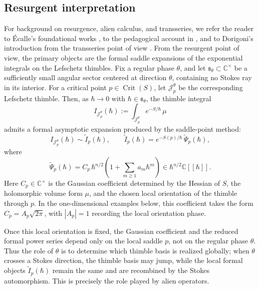 \documentclass[11pt]{amsart}
\theoremstyle{plain}
\newcommand{\C}{\mathbb C}
\newcommand{\Crit}{\operatorname{Crit}}
\newcommand{\J}{\mathcal J}
\begin{document}
\subsection{Resurgent interpretation}\label{sec:resurgence}
For background on resurgence, alien calculus, and transseries, we refer the reader to \'Ecalle's foundational works \cite{Ecalle81a,Ecalle81b,Ecalle85}, to the pedagogical account in \cite{MitschiSauzin2016}, and to Dorigoni's introduction from the transseries point of view \cite{Dorigoni2014}.
From the resurgent point of view, the primary objects are the formal saddle
expansions of the exponential integrals on the Lefschetz thimbles.  Fix a
regular phase \(\theta\), and let \(\mathfrak s_\theta\subset\C^\times\) be
a sufficiently small angular sector centered at direction \(\theta\),
containing no Stokes ray in its interior.  For a critical point
\(p\in\Crit(S)\), let \(\J_p^\theta\) be the corresponding Lefschetz
thimble.  Then, as \(\hbar\to0\) with \(\hbar\in\mathfrak s_\theta\), the
thimble integral
\begin{equation*}
I_{\J_p^\theta}(\hbar)
:=
\int_{\J_p^\theta} e^{-S/\hbar}\,\mu
\end{equation*}
admits a formal asymptotic expansion produced by the saddle-point method:
\begin{equation*}
I_{\J_p^\theta}(\hbar)
\sim
\widetilde I_p(\hbar),
\qquad
\widetilde I_p(\hbar)
=
e^{-S(p)/\hbar}\,
\widetilde\Psi_p(\hbar),
\end{equation*}
where
\begin{equation*}
\widetilde\Psi_p(\hbar)
=
C_p\,\hbar^{n/2}
\left(1+\sum_{m\ge1}a_m\hbar^m\right)
\in
\hbar^{n/2}\C[[\hbar]].
\end{equation*}
Here \(C_p\in\C^\times\) is the Gaussian coefficient determined by the
Hessian of \(S\), the holomorphic volume form \(\mu\), and the chosen local
orientation of the thimble through \(p\).  In the one-dimensional examples
below, this coefficient takes the form \(C_p=A_p\sqrt{2\pi}\), with
\(|A_p|=1\) recording the local orientation phase.

Once this local orientation is fixed, the Gaussian coefficient and the
reduced formal power series depend only on the local saddle \(p\), not on
the regular phase \(\theta\).  Thus the role of \(\theta\) is to determine
which thimble basis is realized globally; when \(\theta\) crosses a Stokes
direction, the thimble basis may jump, while the local formal objects
\(\widetilde I_p(\hbar)\) remain the same and are recombined by the Stokes
automorphism.  This is precisely the role played by alien operators.
\end{document}
